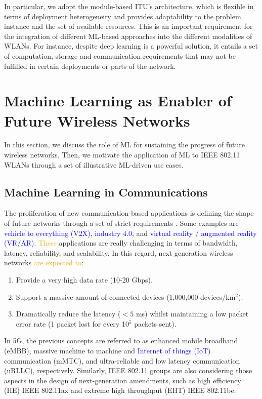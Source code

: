 \documentclass[journal]{IEEEtran}
\begin{document}
In particular, we adopt the module-based ITU's architecture, which is flexible in terms of deployment heterogeneity and provides adaptability to the problem instance and the set of available resources. This is an important requirement for the integration of different ML-based approaches into the different modalities of WLANs. For instance, despite deep learning is a powerful solution, it entails a set of computation, storage and communication requirements that may not be fulfilled in certain deployments or parts of the network.

\section{Machine Learning as Enabler of Future Wireless Networks} 
\label{section:intro_ML}
In this section, we discuss the role of ML for sustaining the progress of future wireless networks. Then, we motivate the application of ML to IEEE 802.11 WLANs through a set of illustrative ML-driven use cases.

\subsection{Machine Learning in Communications}
The proliferation of new communication-based applications is defining the shape of future networks through a set of strict requirements \cite{itu2019use}. Some examples are \textcolor{blue}{vehicle to everything (V2X)}, \textcolor{blue}{industry 4.0}, and \textcolor{blue}{virtual reality / augmented reality (VR/AR)}.  \textcolor{orange}{These} applications are really challenging in terms of bandwidth, latency, reliability, and scalability. In this regard, next-generation wireless networks  \textcolor{orange}{are expected to}:
\begin{enumerate}
	\item Provide a very high data rate (10-20 Gbps).
	\item Support a massive amount of connected devices (1,000,000 devices/km$^2$).
	\item Dramatically reduce the latency ($<5$ ms) whilst maintaining a low packet error rate (1 packet lost for every 10$^5$ packets sent).
\end{enumerate}

In 5G, the previous concepts are referred to as enhanced mobile broadband (eMBB), massive machine to machine and \textcolor{blue}{Internet of things (IoT)} communication (mMTC), and ultra-reliable and low latency communication (uRLLC), respectively. Similarly, IEEE 802.11 groups are also considering those aspects in the design of next-generation amendments, such as high efficiency (HE) IEEE 802.11ax and extreme high throughput (EHT) IEEE 802.11be.
\end{document}
